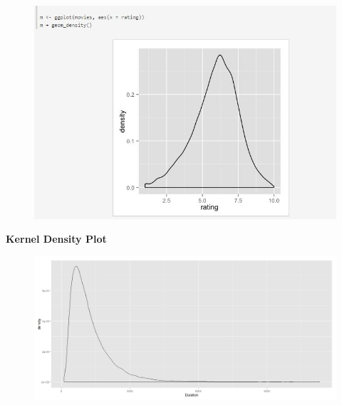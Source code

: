 \documentclass[MAIN.tex]{subfiles}
\begin{document}
\begin{frame}
	\begin{figure}
\centering
\includegraphics[width=1.05\linewidth]{images/ggplot}

\end{figure}

\end{frame}
\begin{frame}
\textbf{Kernel Density Plot}
	\begin{figure}
\centering
\includegraphics[width=1.1\linewidth]{images/gamblerruin-plot}

\end{figure}

\end{frame}
\end{document}

